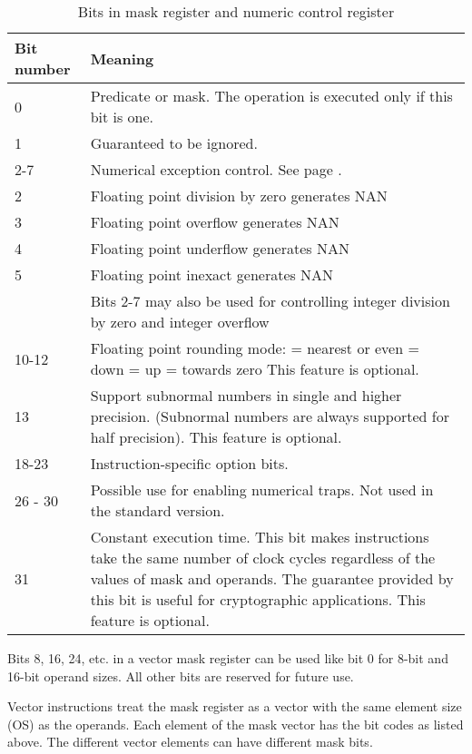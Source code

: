 \documentclass[forwardcom.tex]{subfiles}
\begin{document}
\begin{longtable}
{|p{15mm}|p{90mm}|}
\caption{Bits in mask register and numeric control register}
\label{table:maskBits}
\endfirsthead
\endhead
\hline
\bfseries Bit number & \bfseries Meaning \\
 \hline
0 & Predicate or mask. The operation is executed only if this bit is one.\\
1 & Guaranteed to be ignored. \\
\hline
2-7 & Numerical exception control. See page \pageref{table:FPExceptionResults}. \\
2 & Floating point division by zero generates NAN \\
3 & Floating point overflow generates NAN \\
4 & Floating point underflow generates NAN \\
5 & Floating point inexact generates NAN \\
  & Bits 2-7 may also be used for controlling integer division by zero and integer overflow \\ \hline
10-12 & Floating point rounding mode: \newline
000 = nearest or even \newline
001 = down \newline
010 = up \newline
011 = towards zero \newline
This feature is optional.\\ \hline
13 & Support subnormal numbers in single and higher precision. 
(Subnormal numbers are always supported for half precision). This feature is optional.\\ \hline  
  
18-23 & Instruction-specific option bits.\\
\hline
26 - 30 & Possible use for enabling numerical traps. Not used in the standard version. \\
\hline
31 & Constant execution time. This bit makes instructions take the same number of clock cycles regardless of the values of mask and operands. The guarantee provided by this bit is useful for cryptographic applications. This feature is optional. \\
\hline
\end{longtable}

Bits 8, 16, 24, etc. in a vector mask register can be used like bit 0 for 8-bit and 16-bit operand sizes. All other bits are reserved for future use.
\vv

Vector instructions treat the mask register as a vector with the same element size (OS) as the operands. Each element of the mask vector has the bit codes as listed above. The different vector elements can have different mask bits.
\vv
\end{document}
